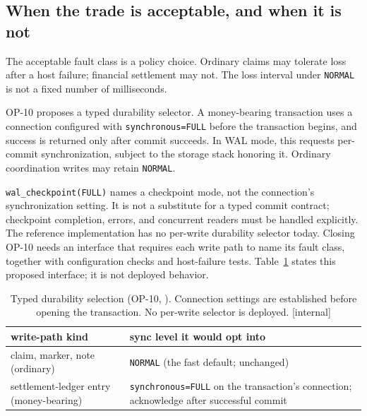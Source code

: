 \documentclass[11pt,a4paper]{article}
\theoremstyle{definition}
\theoremstyle{remark}
\begin{document}
\subsection{When the trade is acceptable, and when it is not}
The acceptable fault class is a policy choice. Ordinary claims may tolerate
loss after a host failure; financial settlement may not. The loss interval under
\texttt{NORMAL} is not a fixed number of milliseconds.

OP-10 proposes a typed durability selector. A money-bearing transaction uses
a connection configured with \texttt{synchronous=FULL} before the transaction
begins, and success is returned only after commit succeeds. In WAL mode, this
requests per-commit synchronization, subject to the storage stack honoring it.
Ordinary coordination writes may retain \texttt{NORMAL}.

\texttt{wal\_checkpoint(FULL)} names a checkpoint mode, not the connection's
synchronization setting. It is not a substitute for a typed commit contract;
checkpoint completion, errors, and concurrent readers must be handled explicitly.
The reference implementation has no per-write durability selector today.
Closing OP-10 needs an interface that requires each write path to name its
fault class, together with configuration checks and host-failure tests.
Table~\ref{tab:swk-selective-checkpoint} states this proposed interface; it is
not deployed behavior.
\begin{table}[H]
\centering
\caption{Typed durability selection (OP-10, \Designed). Connection settings
are established before opening the transaction. No per-write selector is deployed. [internal]}
\label{tab:swk-selective-checkpoint}
\small
\renewcommand{\arraystretch}{1.2}
\begin{tabularx}{\textwidth}{@{}>{\raggedright\arraybackslash}X >{\raggedright\arraybackslash}X@{}}
\toprule
\textbf{write-path kind} & \textbf{sync level it would opt into} \\
\midrule
claim, marker, note (ordinary) & \texttt{NORMAL} (the fast default; unchanged) \\
settlement-ledger entry (money-bearing) & \texttt{synchronous=FULL} on the transaction's connection; acknowledge after successful commit \\
\bottomrule
\end{tabularx}
\end{table}
\end{document}
